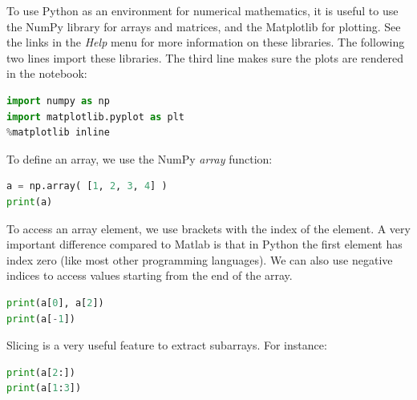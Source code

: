 \documentclass[a4paper , 12pt]{book}
\begin{document}
To use Python as an environment for numerical mathematics, it is useful to use the NumPy library for arrays and matrices, and the Matplotlib for plotting. See the links in the \textit{Help} menu for more information on these libraries. The following two lines import these libraries. The third line makes sure the plots are rendered in the notebook:

\begin{center}
\begin{lstlisting}[language=Python, frame=single]
import numpy as np
import matplotlib.pyplot as plt
%matplotlib inline
\end{lstlisting}
\end{center}

To define an array, we use the NumPy \textit{array} function:

\begin{center}
\begin{lstlisting}[language=Python, frame=single]
a = np.array( [1, 2, 3, 4] )
print(a)
\end{lstlisting}
\end{center}

To access an array element, we use brackets with the index of the element. A very important difference compared to Matlab is that in Python the first element has index zero (like most other programming languages). We can also use negative indices to access values starting from the end of the array.

\begin{center}
\begin{lstlisting}[language=Python, frame=single]
print(a[0], a[2])
print(a[-1])
\end{lstlisting}
\end{center}

Slicing is a very useful feature to extract subarrays. For instance:

\begin{center}
\begin{lstlisting}[language=Python, frame=single]
print(a[2:])
print(a[1:3])
\end{lstlisting}
\end{center}
\end{document}
